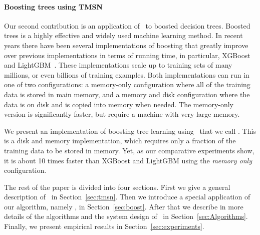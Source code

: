 \paragraph{Boosting trees using TMSN}
Our second contribution is an application of \tmsn\ to boosted
decision trees. Boosted trees is a highly effective and widely used
machine learning method. In recent years there have been several
implementations of boosting that greatly improve over previous
implementations in terms of running time, in particular,
XGBoost~\cite{chen_xgboost:_2016} and
LightGBM~\cite{ke_lightgbm:_2017}. These implementations scale up to
training sets of many millions, or even billions of training examples.
Both implementations can run in one of two configurations: a
memory-only configuration where all of the training data is stored in
main memory, and a memory and disk configuration where the data is on
disk and is copied into memory when needed. The memory-only version is
significantly faster, but require a machine with very large
memory.

We present an implementation of boosting tree learning using
\tmsn\ that we call \Sparrow. This is a disk and memory
implementation, which requires only a fraction of the training data to
be stored in memory.  Yet, as our comparative experiments show, it is
about 10 times faster than XGBoost and LightGBM using the {\em memory
  only} configuration.

The rest of the paper is divided into four sections.
First we give a general description of \tmsn\ in Section~\ref{sec:tmsn}.
Then we introduce a special application of our algorithm, namely \Sparrow, in Section~\ref{sec:boost}.
After that we describe in more details of the algorithms and the system design of \Sparrow\ in
Section~\ref{sec:Algorithms}.
Finally, we present empirical results in Section~\ref{sec:experiments}.
